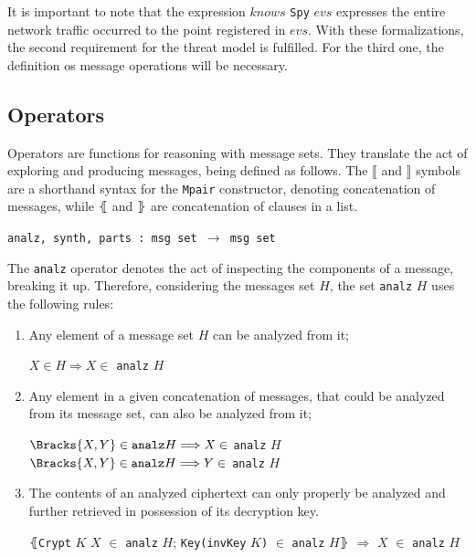 It is important to note that the expression $knows$ \texttt{Spy} $evs$ expresses the entire network traffic occurred to the point registered in $evs$. With these formalizations, the second requirement for the threat model is fulfilled. For the third one, the definition os message operations will be necessary.



\subsection{Operators}
\label{ssec:operators}
Operators are functions for reasoning with message sets. They translate the act of exploring and producing messages, being defined as follows. The $\lBrack$ and $\rBrack$ symbols are a shorthand syntax for the \texttt{Mpair} constructor, denoting concatenation of messages, while $\lBrace$ and $\rBrace$ are concatenation of clauses in a list.

\begin{center}
  \texttt{analz, synth, parts : msg set $\longrightarrow$ msg set}
\end{center}

The \texttt{analz} operator denotes the act of inspecting the components of a message, breaking it up. Therefore, considering the messages set $H$, the set \texttt{analz} $H$ uses the following rules:

\begin{enumerate}
  \item Any element of a message set $H$ can be analyzed from it;
  \begin{center}
    $X \in H \Longrightarrow X \in$ \texttt{analz} $H$
  \end{center}

  \item Any element in a given concatenation of messages, that could be analyzed from its message set, can also be analyzed from it;
  \begin{center}
    $\Bracks{X,Y} \in \texttt{analz} H \Longrightarrow X \in$ \texttt{analz} $H$ \\
    $\Bracks{X,Y} \in \texttt{analz} H \Longrightarrow Y \in$ \texttt{analz} $H$
  \end{center}

  \item The contents of an analyzed ciphertext can only properly be analyzed and further retrieved in possession of its decryption key.
  \begin{center}
    $\lBrace$\texttt{Crypt} $K$ $X$ $\in$ \texttt{analz} $H$; \texttt{Key(invKey} $K$\texttt{)} $\in$ \texttt{analz} $H\rBrace$ $\Longrightarrow$ $X$ $\in$ \texttt{analz} $H$
  \end{center}
\end{enumerate}

